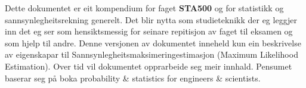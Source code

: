 Dette dokumentet er eit kompendium for faget \textbf{STA500} og for statistikk og sannsynlegheitsrekning generelt. Det blir nytta som studieteknikk der eg leggjer inn det eg ser som hensiktsmessig for seinare repitisjon av faget til eksamen og som hjelp til andre. Denne versjonen av dokumentet inneheld kun ein beskrivelse av eigenskapar til Sannsynlegheitsmaksimeringestimasjon (Maximum Likelihood Estimation). Over tid vil dokumentet opprarbeide seg meir innhald. Pensumet baserar seg på boka \startsitat probability \& statistics for engineers \& scientists\sluttsitat. \cite{walpole2012probability}